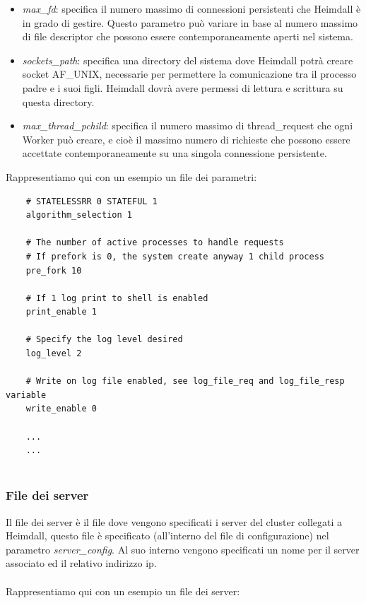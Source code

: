 \documentclass[italian]{tktltiki2}
\begin{document}
\begin{itemize}
	\item \emph{max\_fd}: specifica il numero massimo di connessioni persistenti che Heimdall è in grado di gestire. Questo parametro può variare in base al numero massimo di file descriptor che possono essere contemporaneamente aperti nel sistema.
	
	\item \emph{sockets\_path}: specifica una directory del sistema dove Heimdall potrà creare socket AF\_UNIX, necessarie per permettere la comunicazione tra il processo padre e i suoi figli. Heimdall dovrà avere permessi di lettura e scrittura su questa directory.
	
	\item \emph{max\_thread\_pchild}: specifica il numero massimo di thread\_request che ogni Worker può creare, e cioè il massimo numero di richieste che possono essere accettate contemporaneamente su una singola connessione persistente.
	
\end{itemize}
Rappresentiamo qui con un esempio un file dei parametri:

\begin{lstlisting}
	# STATELESSRR 0 STATEFUL 1
	algorithm_selection 1

	# The number of active processes to handle requests
	# If prefork is 0, the system create anyway 1 child process
	pre_fork 10

	# If 1 log print to shell is enabled
	print_enable 1

	# Specify the log level desired
	log_level 2

	# Write on log file enabled, see log_file_req and log_file_resp variable
	write_enable 0
	
	...
	...
	
\end{lstlisting}

\subsubsection{File dei server}
\label{ssec:config_server}
Il file dei server è il file dove vengono specificati i server del cluster collegati a Heimdall, questo file è specificato (all'interno del file di configurazione) nel parametro \emph{server\_config}. Al suo interno vengono specificati un nome per il server associato ed il relativo indirizzo ip.
\\\\Rappresentiamo qui con un esempio un file dei server:
\end{document}
